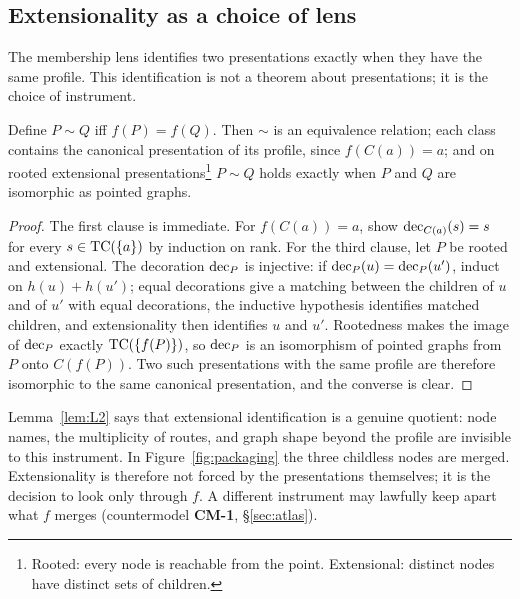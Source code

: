 \subsection{Extensionality as a choice of lens}

The membership lens identifies two presentations exactly when they have the same profile. This
identification is not a theorem about presentations; it is the choice of instrument.

\begin{lemma}\label{lem:L2}
Define $P\sim Q$ iff $f(P)=f(Q)$. Then $\sim$ is an equivalence relation; each class contains the
canonical presentation of its profile, since $f(C(a))=a$; and on rooted extensional
presentations\footnote{Rooted: every node is reachable from the point. Extensional: distinct
nodes have distinct sets of children.} $P\sim Q$ holds exactly when $P$ and $Q$ are isomorphic as
pointed graphs.
\end{lemma}

\begin{proof}
The first clause is immediate. For $f(C(a))=a$, show $\operatorname{dec}_{C(a)}(s)=s$ for every
$s\in\operatorname{TC}(\{a\})$ by induction on rank. For the third clause, let $P$ be rooted and extensional.
The decoration $\operatorname{dec}_P$ is injective: if $\operatorname{dec}_P(u)=\operatorname{dec}_P(u')$, induct on $h(u)+h(u')$; equal
decorations give a matching between the children of $u$ and of $u'$ with equal decorations, the
inductive hypothesis identifies matched children, and extensionality then identifies $u$ and
$u'$. Rootedness makes the image of $\operatorname{dec}_P$ exactly $\operatorname{TC}(\{f(P)\})$, so $\operatorname{dec}_P$ is an
isomorphism of pointed graphs from $P$ onto $C(f(P))$. Two such presentations with the same
profile are therefore isomorphic to the same canonical presentation, and the converse is clear.
\end{proof}

\begin{remark}\label{rem:lens-forgets}
Lemma~\ref{lem:L2} says that extensional identification is a genuine quotient: node names, the
multiplicity of routes, and graph shape beyond the profile are invisible to this instrument. In
Figure~\ref{fig:packaging} the three childless nodes are merged. Extensionality is therefore not
forced by the presentations themselves; it is the decision to look only through $f$. A different
instrument may lawfully keep apart what $f$ merges (countermodel \textbf{CM-1},
\S\ref{sec:atlas}).
\end{remark}

